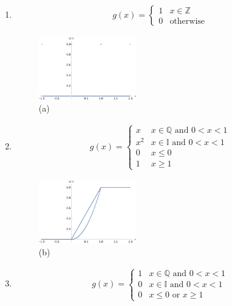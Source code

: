 \begin{enumerate}[label=(\alph*)]
    \item 
    \begin{align*}
        g(x) = \begin{cases}
            1 & x\in \mathbb{Z} \\ 
            0 & \text{otherwise}
        \end{cases}
    \end{align*}

    \begin{figure}[h]
        \includegraphics[width=0.4\textwidth]{4 Functional Limits and Continuity/4_3_11/4_3_11_a.png}
        \caption[]{ (a)}
        \label{fig:4_3_11_a}
    \end{figure}

    \item
    \begin{align*}
        g(x) = \begin{cases}
            x & x \in \mathbb{Q} \text{ and } 0<x<1 \\ 
            x^2 & x \in \mathbb{I} \text{ and } 0<x<1 \\ 
            0 & x \leq 0 \\
            1 & x \geq  1
        \end{cases}
    \end{align*}

    \begin{figure}[h]
        \includegraphics[width=0.4\textwidth]{4 Functional Limits and Continuity/4_3_11/4_3_11_b.png}
        \caption[]{ (b)}
        \label{fig:4_3_11_b}
    \end{figure}

    \item
    \begin{align*}
        g(x) = \begin{cases}
            1 & x \in \mathbb{Q} \text{ and } 0<x<1 \\ 
            0 & x \in \mathbb{I} \text{ and } 0<x<1 \\ 
            0 & x\leq 0 \text{ or } x\geq 1
        \end{cases}
    \end{align*}


\end{enumerate}
